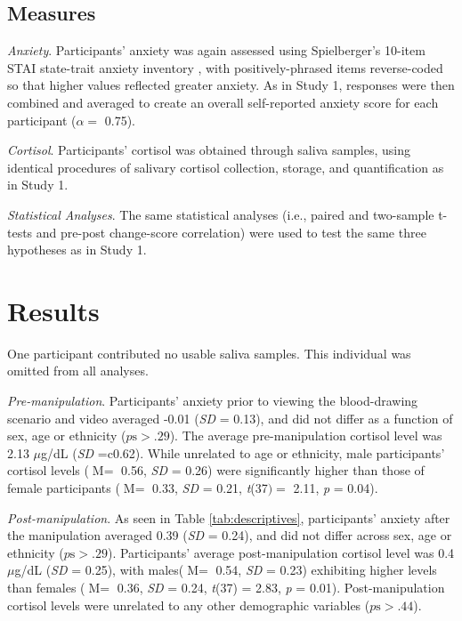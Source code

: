 \documentclass[review]{elsarticle}\usepackage[]{graphicx}\usepackage[]{color}
\begin{document}
\subsection*{Measures}
\label{sub:measures2}

\emph{Anxiety}. Participants' anxiety was again assessed using Spielberger's 10-item STAI state-trait anxiety inventory \cite{spielberger1983assessment}, with positively-phrased items reverse-coded so that higher values reflected greater anxiety.
As in Study 1, responses were then combined and averaged to create an overall self-reported anxiety score for each participant ($\alpha =$ 0.75).

\emph{Cortisol}. Participants' cortisol was obtained through saliva samples, using identical procedures of salivary cortisol collection, storage, and quantification as in Study 1.

\emph{Statistical Analyses}. The same statistical analyses (i.e., paired and two-sample t-tests and pre-post change-score correlation) were used to test the same three hypotheses as in Study 1.

\section*{Results}
\label{sec:results2}

One participant contributed no usable saliva samples.
This individual was omitted from all analyses.

\emph{Pre-manipulation}. Participants' anxiety prior to viewing the blood-drawing scenario and video averaged -0.01 (\textit{SD} = 0.13), and did not differ as a function of sex, age or ethnicity ($p \mbox{s} > .29$).
The average pre-manipulation cortisol level was 2.13 $\mu$g/dL (\textit{SD} =c0.62).
While unrelated to age or ethnicity, male participants' cortisol levels ($\mbox{M} = $ 0.56, \textit{SD} = 0.26) were significantly higher than those of female participants ($\mbox{M} = $ 0.33, \textit{SD} = 0.21, \textit{t}(37$) = $ 2.11, \textit{p} = 0.04).

\emph{Post-manipulation}. As seen in Table \ref{tab:descriptives}, participants' anxiety after the manipulation averaged 0.39 (\textit{SD} = 0.24), and did not differ across sex, age or ethnicity ($p \mbox{s} > .29$).
Participants' average post-manipulation cortisol level was 0.4 $\mu$g/dL (\textit{SD} = 0.25), with males($\mbox{M} = $ 0.54, \textit{SD} = 0.23) exhibiting higher levels than females ($\mbox{M} = $ 0.36, \textit{SD} = 0.24, \textit{t}(37) = 2.83, \textit{p} = 0.01).
Post-manipulation cortisol levels were unrelated to any other demographic variables ($p\mbox{s} > .44$).
\end{document}
